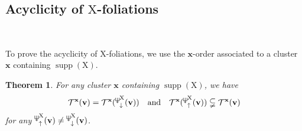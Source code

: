 \documentclass[11pt,reqno]{amsart}
\newcommand{\Neptune}{\mathord{\text{\tikz[baseline=-.5ex,scale=.13]{\draw[line width=.45pt] (0,0)--(0,1.8) (-.6,1.8)--(-.6,.8)--(.6,.8)--(.6,1.8) (-.35,.35)--(.35,.35);}}}}
\theoremstyle{plain}
\newtheorem{theorem}{Theorem}[section]
\theoremstyle{definition}
\numberwithin{equation}{section}
\newcommand\ZZ{\mathbb{Z}}
\newcommand\<{\langle}
\renewcommand\>{\rangle}
\newcommand{\on}[1]{\operatorname{#1}}
\def\CCx{\on{Cpx}}   %
\def\vv{\mathbf{v}}
\def\sink{X}
\newcommand{\ccpt}[1]{\mathrm{#1}}%
\def\xevo{\ccpt{X}}%
\newcommand{\bfit}[1]{\textbf{\textit{#1}}}
\def\seeds{\mathbf{\Sigma}}
\def\xx{\mathbf{x}}%
\def\yy{\mathbf{y}}%
\def\gvec{\bfit{g}}
\def\Gmat{{G}}
\def\Fpoly{{F}}
\def\supp{\on{supp}}
\newcommand{\suppd}[1]{\operatorname{\Neptune}_{\downarrow}^{#1}}
\newcommand{\suppu}[1]{\operatorname{\Neptune}_{\uparrow}^{#1}}
\newcommand{\ol}[1]{\overline{#1}}
\def\ZZp{\ZZ_{\ge0}}
\newcommand{\dom}[1]{\mathcal{T}^{#1}}
\begin{document}



\subsection{Acyclicity of $\xevo$-foliations}\

To prove the acyclicity of $\xevo$-foliations,
we use the ${\xx}$-order associated to a cluster ${\xx}$ containing $\supp(\xevo)$.

\begin{theorem}\label{thm:X-order}
For any cluster ${\xx}$ containing $\supp(\xevo)$, we have
\begin{gather}\label{eq:u>w>d}
    \dom{{\xx}}(\vv)=\dom{{\xx}}(\suppd{\xevo}(\vv))
    \quad\text{and}\quad
    \dom{{\xx}}(\suppu{\xevo}(\vv))\subsetneqq\dom{{\xx}}(\vv)
\end{gather}
for any $\suppu{\xevo}(\vv)\ne\suppd{\xevo}(\vv)$.
\end{theorem}
\end{document}
